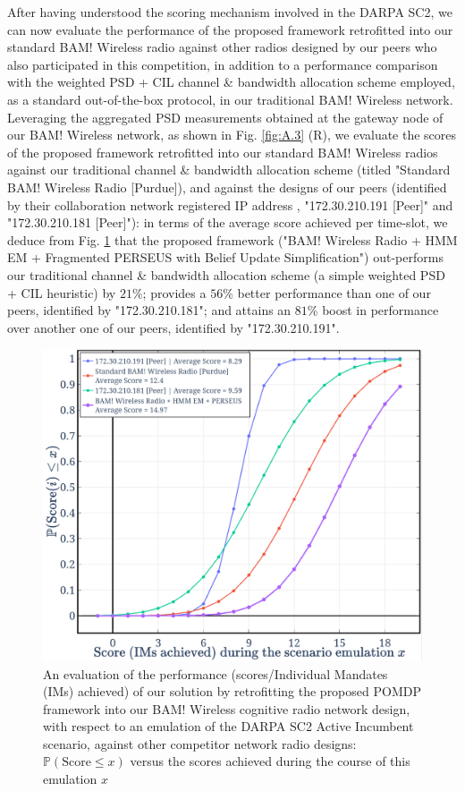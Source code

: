 \documentclass[10pt, twocolumn]{IEEEtran}
\begin{document}
After having understood the scoring mechanism involved in the DARPA SC2, we can now evaluate the performance of the proposed framework retrofitted into our standard BAM! Wireless radio \cite{BAM} against other radios designed by our peers who also participated in this competition, in addition to a performance comparison with the weighted PSD + CIL \cite{DARPA:CIL} channel \& bandwidth allocation scheme employed, as a standard out-of-the-box protocol, in our traditional BAM! Wireless network. Leveraging the aggregated PSD measurements obtained at the gateway node of our BAM! Wireless network, as shown in Fig. \ref{fig:A.3} (R), we evaluate the scores of the proposed framework retrofitted into our standard BAM! Wireless radios against our traditional channel \& bandwidth allocation scheme (titled "Standard BAM! Wireless Radio [Purdue]), and against the designs of our peers (identified by their collaboration network registered IP address \cite{DARPA:CIL}, "172.30.210.191 [Peer]" and "172.30.210.181 [Peer]"): in terms of the average score achieved per time-slot, we deduce from Fig. \ref{fig: Y. 4} that the proposed framework ("BAM! Wireless Radio + HMM EM + Fragmented PERSEUS with Belief Update Simplification") out-performs our traditional channel \& bandwidth allocation scheme (a simple weighted PSD + CIL heuristic) by $21$\%; provides a $56$\% better performance than one of our peers, identified by "172.30.210.181"; and attains an $81$\% boost in performance over another one of our peers, identified by "172.30.210.191".
\vspace{-4mm}
\begin{figure} [t]
    \centerline{
    \includegraphics[width=0.8\linewidth]{figures/Minerva_DARPA_SC2_Scores_plot.png}}
    \vspace{-2mm}
    \caption{An evaluation of the performance (scores/Individual Mandates (IMs) achieved) of our solution by retrofitting the proposed POMDP framework into our BAM! Wireless cognitive radio network design, with respect to an emulation of the DARPA SC2 Active Incumbent scenario, against other competitor network radio designs: $\mathbb{P}(\text{Score}{\leq}x)$ versus the scores achieved during the course of this emulation $x$}
    \vspace{-5mm}
    \label{fig: Y. 4}
\end{figure}
\end{document}
